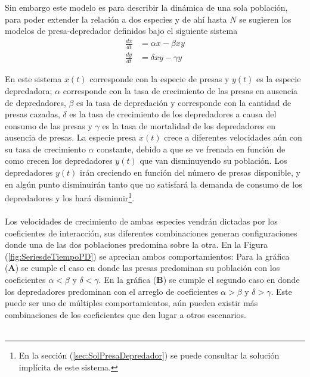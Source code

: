 Sin embargo este modelo es para describir la dinámica de una sola población, para poder extender la relación a dos especies y de ahí hasta $N$ se sugieren los modelos de presa-depredador definidos bajo el siguiente sistema
\begin{equation}\label{eqn:PresaDepredador}
	\begin{split}
		\frac{dx}{dt} &= \alpha x - \beta xy\\
		\frac{dy}{dt} &= \delta xy -\gamma y
	\end{split}
\end{equation}

En este sistema $x(t)$ corresponde con la especie de presas y $y(t)$ es la especie depredadora; $\alpha$ corresponde con la tasa de crecimiento de las presas en ausencia de depredadores, $\beta$ es la tasa de depredación y corresponde con la cantidad de presas cazadas, $\delta$ es la tasa de crecimiento de los depredadores a causa del consumo de las presas y $\gamma$ es la tasa de mortalidad de los depredadores en ausencia de presas. La especie presa $x(t)$ crece a diferentes velocidades aún con su tasa de crecimiento $\alpha$ constante, debido a que se ve frenada en función de como crecen los depredadores $y(t)$ que van disminuyendo su población. Los depredadores $y(t)$ irán creciendo en función del número de presas disponible, y en algún punto disminuirán tanto que no satisfará la demanda de consumo de los depredadores y los hará disminuir\footnote{En la sección (\ref{sec:SolPresaDepredador}) se puede consultar la solución implícita de este sistema.}. \\
\\
Los velocidades de crecimiento de ambas especies vendrán dictadas por los coeficientes de interacción, sus diferentes combinaciones generan configuraciones donde una de las dos poblaciones predomina sobre la otra. En la Figura (\ref{fig:SeriesdeTiempoPD}) se aprecian ambos comportamientos: Para la gráfica (\textbf{A}) se cumple el caso en donde las presas predominan su población con los coeficientes $\alpha<\beta$ y $\delta<\gamma$. En la gráfica (\textbf{B}) se cumple el segundo caso en donde los depredadores predominan con el arreglo de coeficientes $\alpha>\beta$ y $\delta>\gamma$. Este puede ser uno de múltiples comportamientos, aún pueden existir más combinaciones de los coeficientes que den lugar a otros escenarios. 
\\
\\
